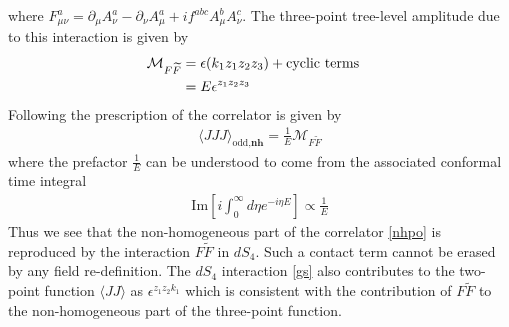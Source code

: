 \documentclass[a4paper,11pt]{article}
\begin{document}
 where $F^a_{\mu\nu} = \partial_{\mu}A^a_{\nu}-\partial_{\nu}A^a_{\mu}+i f^{abc}A^b_{\mu}A^c_{\nu}$. The three-point tree-level amplitude due to this interaction is given by
 \begin{align}
 \mathcal{M}_{F\widetilde{F}} &= \epsilon(k_1 z_1 z_2 z_3)+\text{cyclic terms}\cr
 & = E\epsilon^{z_1z_2z_3}
 \end{align}
Following the prescription of \cite{Maldacena:2011nz} the correlator is given by
 \begin{align}
 \langle JJJ\rangle_{\text{odd},\textbf{nh}}=\frac{1}{E} \mathcal{M}_{F\widetilde{F}} 
 \end{align}
where the prefactor $\frac 1E$ can be understood to come from the associated conformal time integral 
 \begin{align}
 \text{Im}\left[i\int_{0}^{\infty}d\eta e^{-i\eta E}\right] \propto \frac{1}{E}
 \end{align}
 Thus we see that the non-homogeneous part of the correlator \eqref{nhpo} is reproduced by the interaction $F\widetilde F$ in $dS_4$. Such a contact term cannot be erased by any field re-definition. The $dS_4$ interaction \eqref{gs} also contributes to the two-point function $\langle JJ\rangle$ as $\epsilon^{z_1z_2k_1}$ which is consistent with the contribution of $F\widetilde F$ to the non-homogeneous part of the three-point function.
 
\end{document}
